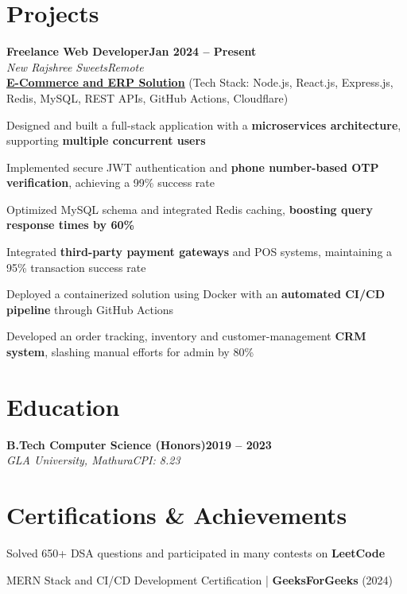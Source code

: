 \documentclass[letterpaper, 10pt]{article}
\newcommand{\heading}[2]{ \hspace{5pt}#1\hfill#2\\[1pt] }
\newcommand{\headingBf}[2]{ \heading{\textbf{#1}}{\textbf{#2}} }
\newcommand{\headingIt}[2]{ \heading{\textit{#1}}{\textit{#2}} }
\newenvironment{resume_list}{
\vspace{-3pt}
\begin{itemize}[itemsep=0.5pt, parsep=0.5pt, leftmargin=18pt] }{ \end{itemize}
\vspace{-3pt}
}
\begin{document}
\section{Projects}
\headingBf{Freelance Web Developer}{Jan 2024 -- Present}
\headingIt{New Rajshree Sweets}{Remote}
\hspace{10pt}\textbf{\href{https://newrajshreesweets.com}{\underline{E-Commerce and ERP Solution}}}
\small{(Tech Stack: Node.js, React.js, Express.js, Redis, MySQL, REST APIs, GitHub Actions, Cloudflare)}
\begin{resume_list}
    \item Designed and built a full-stack application with a \textbf{microservices architecture}, supporting \textbf{multiple concurrent users}
    \item Implemented secure JWT authentication and \textbf{phone number-based OTP verification}, achieving a 99\% success rate
    \item Optimized MySQL schema and integrated Redis caching, \textbf{boosting query response times by 60\%}
    \item Integrated \textbf{third-party payment gateways} and POS systems, maintaining a 95\% transaction success rate
    \item Deployed a containerized solution using Docker with an \textbf{automated CI/CD pipeline} through GitHub Actions
    \item Developed an order tracking, inventory and customer-management \textbf{CRM system}, slashing manual efforts for admin by 80\%
\end{resume_list}

\section{Education}
\headingBf{B.Tech Computer Science (Honors)}{2019 -- 2023}
\headingIt{GLA University, Mathura}{CPI: 8.23}

\section{Certifications \& Achievements}
\begin{resume_list}
    \item Solved 650+ DSA questions and participated in many contests on \textbf{LeetCode} \href{https://leetcode.com/u/KeshariPiyush24/}{\faLink}
    \item MERN Stack and CI/CD Development Certification | \textbf{GeeksForGeeks} (2024) \href{https://media.geeksforgeeks.org/certificates/1706532819/013b39c1dda8d49bf888496b0d0d6b1b.pdf}{\faLink}
\end{resume_list}
\end{document}
